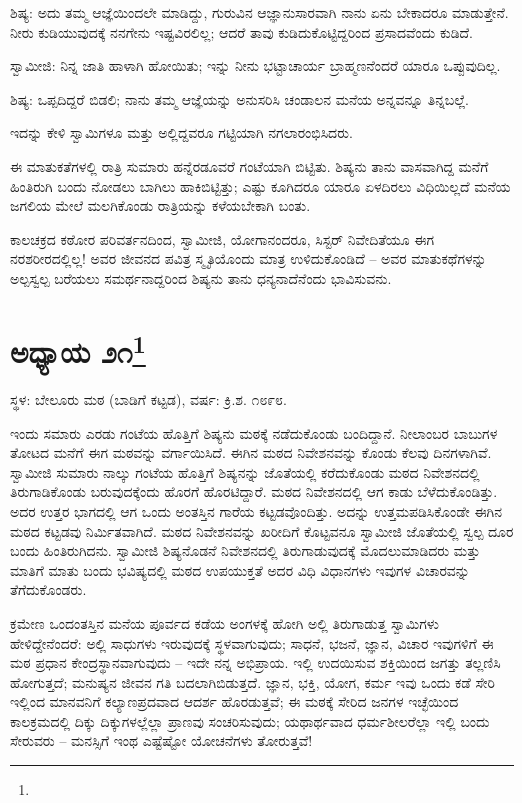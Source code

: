 ಶಿಷ್ಯ: ಅದು ತಮ್ಮ ಆಜ್ಞೆಯಿಂದಲೇ ಮಾಡಿದ್ದು, ಗುರುವಿನ ಆಜ್ಞಾನುಸಾರವಾಗಿ ನಾನು ಏನು ಬೇಕಾದರೂ ಮಾಡುತ್ತೇನೆ. ನೀರು ಕುಡಿಯುವುದಕ್ಕೆ ನನಗೇನು ಇಷ್ಟವಿರಲಿಲ್ಲ; ಆದರೆ ತಾವು ಕುಡಿದುಕೊಟ್ಟಿದ್ದರಿಂದ ಪ್ರಸಾದವೆಂದು ಕುಡಿದೆ.

ಸ್ವಾಮೀಜಿ: ನಿನ್ನ ಜಾತಿ ಹಾಳಾಗಿ ಹೋಯಿತು; ಇನ್ನು ನೀನು ಭಟ್ಟಾಚಾರ್ಯ ಬ್ರಾಹ್ಮಣನೆಂದರೆ ಯಾರೂ ಒಪ್ಪುವುದಿಲ್ಲ.

ಶಿಷ್ಯ: ಒಪ್ಪದಿದ್ದರೆ ಬಿಡಲಿ; ನಾನು ತಮ್ಮ ಆಜ್ಞೆಯನ್ನು ಅನುಸರಿಸಿ ಚಂಡಾಲನ ಮನೆಯ ಅನ್ನವನ್ನೂ ತಿನ್ನಬಲ್ಲೆ.

ಇದನ್ನು ಕೇಳಿ ಸ್ವಾಮಿಗಳೂ ಮತ್ತು ಅಲ್ಲಿದ್ದವರೂ ಗಟ್ಟಿಯಾಗಿ ನಗಲಾರಂಭಿಸಿದರು.

ಈ ಮಾತುಕತೆಗಳಲ್ಲಿ ರಾತ್ರಿ ಸುಮಾರು ಹನ್ನೆರಡೂವರೆ ಗಂಟೆಯಾಗಿ ಬಿಟ್ಟಿತು. ಶಿಷ್ಯನು ತಾನು ವಾಸವಾಗಿದ್ದ ಮನೆಗೆ ಹಿಂತಿರುಗಿ ಬಂದು ನೋಡಲು ಬಾಗಿಲು ಹಾಕಿಬಿಟ್ಟಿತ್ತು; ಎಷ್ಟು ಕೂಗಿದರೂ ಯಾರೂ ಏಳದಿರಲು ವಿಧಿಯಿಲ್ಲದೆ ಮನೆಯ ಜಗಲಿಯ ಮೇಲೆ ಮಲಗಿಕೊಂಡು ರಾತ್ರಿಯನ್ನು ಕಳೆಯಬೇಕಾಗಿ ಬಂತು.

ಕಾಲಚಕ್ರದ ಕಠೋರ ಪರಿವರ್ತನದಿಂದ, ಸ್ವಾಮೀಜಿ, ಯೋಗಾನಂದರೂ, ಸಿಸ್ಟರ್ ನಿವೇದಿತೆಯೂ ಈಗ ನರಶರೀರದಲ್ಲಿಲ್ಲ! ಅವರ ಜೀವನದ ಪವಿತ್ರ ಸ್ಮೃತಿಯೊಂದು ಮಾತ್ರ ಉಳಿದುಕೊಂಡಿದೆ – ಅವರ ಮಾತುಕಥೆಗಳನ್ನು ಅಲ್ಪಸ್ವಲ್ಪ ಬರೆಯಲು ಸಮರ್ಥನಾದ್ದರಿಂದ ಶಿಷ್ಯನು ತಾನು ಧನ್ಯನಾದೆನೆಂದು ಭಾವಿಸುವನು.

\newpage

\chapter[ಅಧ್ಯಾಯ ೨೧]{ಅಧ್ಯಾಯ ೨೧\protect\footnote{}}

\centerline{ಸ್ಥಳ: ಬೇಲೂರು ಮಠ (ಬಾಡಿಗೆ ಕಟ್ಟಡ), ವರ್ಷ: ಕ್ರಿ.ಶ. ೧೮೯೮.}

ಇಂದು ಸಮಾರು ಎರಡು ಗಂಟೆಯ ಹೊತ್ತಿಗೆ ಶಿಷ್ಯನು ಮಠಕ್ಕೆ ನಡೆದುಕೊಂಡು ಬಂದಿದ್ದಾನೆ. ನೀಲಾಂಬರ ಬಾಬುಗಳ ತೋಟದ ಮನೆಗೆ ಈಗ ಮಠವನ್ನು ವರ್ಗಾಯಿಸಿದೆ. ಈಗಿನ ಮಠದ ನಿವೇಶನವನ್ನು ಕೊಂಡು ಕೆಲವು ದಿನಗಳಾಗಿವೆ. ಸ್ವಾಮೀಜಿ ಸುಮಾರು ನಾಲ್ಕು ಗಂಟೆಯ ಹೊತ್ತಿಗೆ ಶಿಷ್ಯನನ್ನು ಜೊತೆಯಲ್ಲಿ ಕರೆದುಕೊಂಡು ಮಠದ ನಿವೇಶನದಲ್ಲಿ ತಿರುಗಾಡಿಕೊಂಡು ಬರುವುದಕ್ಕೆಂದು ಹೊರಗೆ ಹೊರಟಿದ್ದಾರೆ. ಮಠದ ನಿವೇಶನದಲ್ಲಿ ಆಗ ಕಾಡು ಬೆಳೆದುಕೊಂಡಿತ್ತು. ಅದರ ಉತ್ತರ ಭಾಗದಲ್ಲಿ ಆಗ ಒಂದು ಅಂತಸ್ತಿನ ಗಾರೆಯ ಕಟ್ಟಡವೊಂದಿತ್ತು. ಅದನ್ನು ಉತ್ತಮಪಡಿಸಿಕೊಂಡೇ ಈಗಿನ ಮಠದ ಕಟ್ಟಡವು ನಿರ್ಮಿತವಾಗಿದೆ. ಮಠದ ನಿವೇಶನವನ್ನು ಖರೀದಿಗೆ ಕೊಟ್ಟವನೂ ಸ್ವಾಮೀಜಿ ಜೊತೆಯಲ್ಲಿ ಸ್ವಲ್ಪ ದೂರ ಬಂದು ಹಿಂತಿರುಗಿದನು. ಸ್ವಾಮೀಜಿ ಶಿಷ್ಯನೊಡನೆ ನಿವೇಶನದಲ್ಲಿ ತಿರುಗಾಡುವುದಕ್ಕೆ ಮೊದಲುಮಾಡಿದರು ಮತ್ತು ಮಾತಿಗೆ ಮಾತು ಬಂದು ಭವಿಷ್ಯದಲ್ಲಿ ಮಠದ ಉಪಯುಕ್ತತೆ ಅದರ ವಿಧಿ ವಿಧಾನಗಳು ಇವುಗಳ ವಿಚಾರವನ್ನು ತೆಗೆದುಕೊಂಡರು.

ಕ್ರಮೇಣ ಒಂದಂತಸ್ತಿನ ಮನೆಯ ಪೂರ್ವದ ಕಡೆಯ ಅಂಗಳಕ್ಕೆ ಹೋಗಿ ಅಲ್ಲಿ ತಿರುಗಾಡುತ್ತ ಸ್ವಾಮಿಗಳು ಹೇಳಿದ್ದೇನೆಂದರೆ: ಅಲ್ಲಿ ಸಾಧುಗಳು ಇರುವುದಕ್ಕೆ ಸ್ಥಳವಾಗುವುದು; ಸಾಧನೆ, ಭಜನೆ, ಜ್ಞಾನ, ವಿಚಾರ ಇವುಗಳಿಗೆ ಈ ಮಠ ಪ್ರಧಾನ ಕೇಂದ್ರಸ್ಥಾನವಾಗುವುದು – ಇದೇ ನನ್ನ ಅಭಿಪ್ರಾಯ. ಇಲ್ಲಿ ಉದಯಿಸುವ ಶಕ್ತಿಯಿಂದ ಜಗತ್ತು ತಲ್ಲಣಿಸಿ ಹೋಗುತ್ತದೆ; ಮನುಷ್ಯನ ಜೀವನ ಗತಿ ಬದಲಾಗಿಬಿಡುತ್ತದೆ. ಜ್ಞಾನ, ಭಕ್ತಿ, ಯೋಗ, ಕರ್ಮ ಇವು ಒಂದು ಕಡೆ ಸೇರಿ ಇಲ್ಲಿಂದ ಮಾನವನಿಗೆ ಕಲ್ಯಾಣಪ್ರದವಾದ ಆದರ್ಶ ಹೊರಡುತ್ತವೆ; ಈ ಮಠಕ್ಕೆ ಸೇರಿದ ಜನಗಳ ಇಚ್ಛೆಯಿಂದ ಕಾಲಕ್ರಮದಲ್ಲಿ ದಿಕ್ಕು ದಿಕ್ಕುಗಳಲ್ಲೆಲ್ಲಾ ಪ್ರಾಣವು ಸಂಚರಿಸುವುದು; ಯಥಾರ್ಥವಾದ ಧರ್ಮಶೀಲರೆಲ್ಲಾ ಇಲ್ಲಿ ಬಂದು ಸೇರುವರು – ಮನಸ್ಸಿಗೆ ಇಂಥ ಎಷ್ಟೆಷ್ಟೋ ಯೋಚನೆಗಳು ತೋರುತ್ತವೆ!

